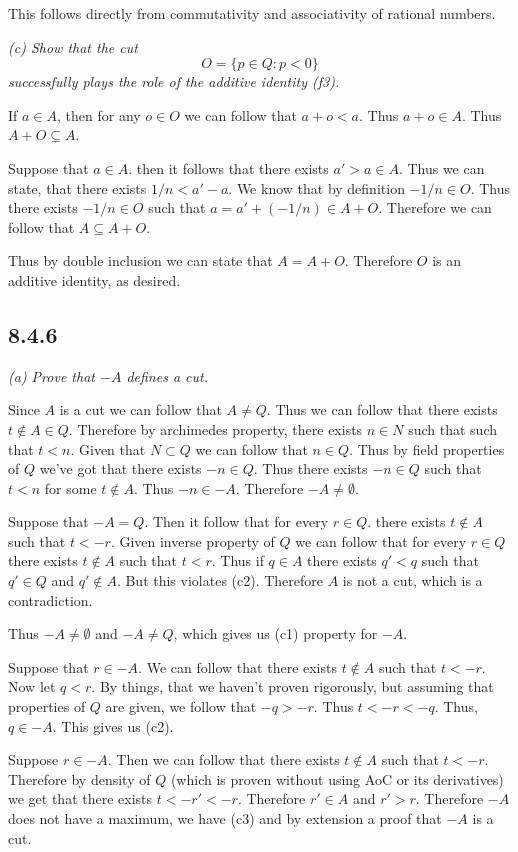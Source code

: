 \documentclass[11pt,oneside,titlepage]{book}
\begin{document}
This follows directly from commutativity and associativity of rational numbers.

\textit{(c) Show that the cut }
$$O = \{p \in Q: p < 0\}$$
\textit{successfully plays the role of the additive identity (f3).}

If $a \in A$, then for any $o \in O$ we can follow that $a + o < a$. Thus $a + o \in A$. Thus
$A + O \subseteq A$.

Suppose that $a \in A$. then it follows that there exists $a' > a \in A$. Thus we can state,
that there exists $1/n < a' - a$. We know that by definition $-1/n \in O$. Thus there exists
$-1/n \in O$ such that $a = a' + (-1/n) \in A + O$. Therefore
we can follow that $A \subseteq A + O$.

Thus by double inclusion we can state that $A = A + O$. Therefore $O$ is an additive identity,
as desired.

\subsection*{8.4.6}

\textit{(a) Prove that $-A$ defines a cut.}

Since $A$ is a  cut we can follow that $A \neq Q$. Thus we can follow that there exists
$t \notin A \in Q$. Therefore by archimedes property, there exists $n \in N$ such that
such that $t < n$. Given that $N \subset Q$ we can follow that $n \in Q$. Thus
by field properties of $Q$ we've got that there exists $-n \in Q$. Thus there exists
$-n \in Q$ such that $t < n$ for some $t \notin A$. Thus $-n \in -A$. Therefore
$-A \neq \emptyset$.

Suppose that $-A = Q$. Then it follow that for every $r \in Q$. there exists $t \notin A$
such that $t < -r$. Given inverse property of $Q$  we can follow that for
every $r \in Q$ there exists $t \notin A$  such that $t < r$. Thus if $q \in A$ there exists
$q' < q$ such that $q' \in Q$ and $q' \notin A$. But this violates (c2).
Therefore $A$ is not a cut, which is a contradiction.

Thus $-A \neq \emptyset$ and $-A  \neq Q$, which gives us (c1) property for $-A$.

Suppose that $r \in -A$. We can follow that there exists $t \notin A$ such that
$t < -r$. Now let $q < r$. By things, that we haven't proven rigorously, but assuming that
properties of $Q$ are given, we follow that $-q > -r$. Thus $t < -r < -q$. Thus, $q \in -A$.
This gives us (c2).

Suppose $r \in -A$. Then we can follow that there exists $t \notin A$ such that $t < -r$.
Therefore by density of $Q$ (which is proven without using AoC or its derivatives)
we get that there exists $t < -r' < -r$. Therefore $r' \in A$
and $r' > r$. Therefore $-A$ does not have a maximum, we have (c3) and by extension a
proof that $-A$ is a cut.
\end{document}
